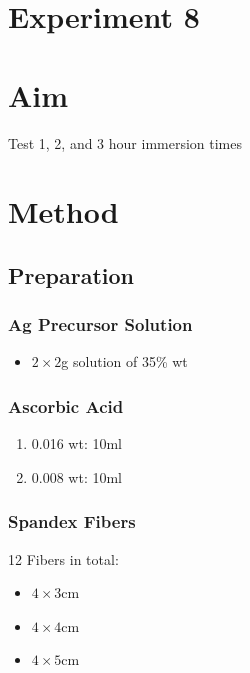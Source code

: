 \documentclass{article}
\begin{document}
\section*{Experiment 8}

\section{Aim}
Test 1, 2, and 3 hour immersion times 

\section{Method}
\subsection{Preparation}
\subsubsection{Ag Precursor Solution}
\begin{itemize}
    \item  $2 \times 2$g solution of  35\% wt
\end{itemize}

\subsubsection{Ascorbic Acid}
\begin{enumerate}
    \item 0.016 wt: 10ml
    \item 0.008 wt: 10ml
\end{enumerate}

\subsubsection{Spandex Fibers}
12 Fibers in total:
\begin{itemize}
    \item $4\times 3$cm
    \item $4\times 4$cm
    \item $4\times 5$cm
\end{itemize}
\end{document}
